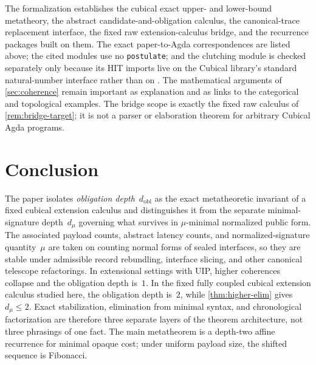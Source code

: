 \documentclass{lmcs}
\begin{document}
\begin{rem}
\label{rem:mech-scope}
The formalization establishes the cubical exact upper- and lower-bound metatheory, the abstract candidate-and-obligation calculus, the canonical-trace replacement interface, the fixed raw extension-calculus bridge, and the recurrence packages built on them. The exact paper-to-Agda correspondences are listed above; the cited modules use no \texttt{postulate}; and the clutching module is checked separately only because its HIT imports live on the Cubical library's standard natural-number interface rather than on . The mathematical arguments of \autoref{sec:coherence} remain important as explanation and as links to the categorical and topological examples. The bridge scope is exactly the fixed raw calculus of \autoref{rem:bridge-target}; it is not a parser or elaboration theorem for arbitrary Cubical Agda programs.
\end{rem}

\section{Conclusion}
\label{sec:conclusion}

The paper isolates \emph{obligation depth}~$d_{\mathrm{obl}}$ as the exact metatheoretic invariant of a fixed cubical extension calculus and distinguishes it from the separate minimal-signature depth~$d_\mu$ governing what survives in $\mu$-minimal normalized public form. The associated payload counts, abstract latency counts, and normalized-signature quantity~$\mu$ are taken on counting normal forms of sealed interfaces, so they are stable under admissible record rebundling, interface slicing, and other canonical telescope refactorings. In extensional settings with UIP, higher coherences collapse and the obligation depth is~$1$. In the fixed fully coupled cubical extension calculus studied here, the obligation depth is~$2$, while \autoref{thm:higher-elim} gives $d_\mu \leq 2$. Exact stabilization, elimination from minimal syntax, and chronological factorization are therefore three separate layers of the theorem architecture, not three phrasings of one fact. The main metatheorem is a depth-two affine recurrence for minimal opaque cost; under uniform payload size, the shifted sequence is Fibonacci.
\end{document}
